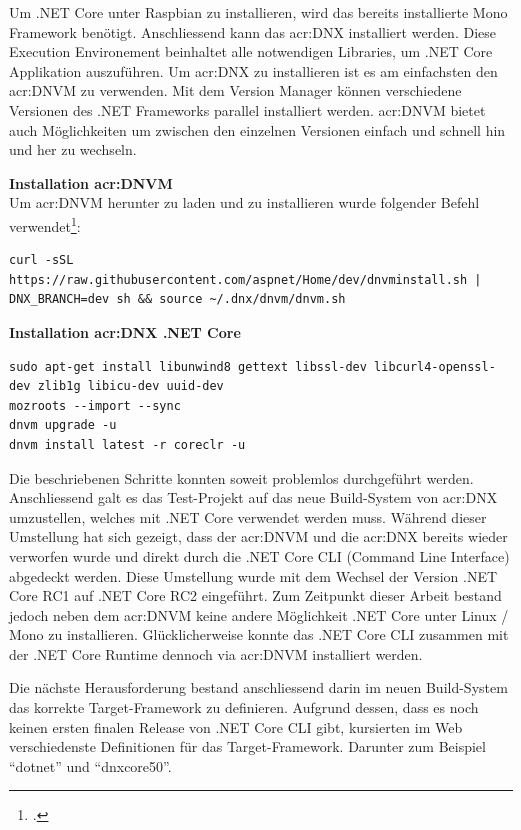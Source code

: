 Um .NET Core unter Raspbian zu installieren, wird das bereits installierte Mono Framework benötigt. Anschliessend kann das \gls{acr:DNX} installiert werden. Diese Execution Environement beinhaltet alle notwendigen Libraries, um .NET Core Applikation auszuführen. Um  \gls{acr:DNX} zu installieren ist es am einfachsten den \gls{acr:DNVM} zu verwenden. Mit dem Version Manager können verschiedene Versionen des .NET Frameworks parallel installiert werden. \gls{acr:DNVM} bietet auch Möglichkeiten um zwischen den einzelnen Versionen einfach und schnell hin und her zu wechseln.

\textbf{Installation \gls{acr:DNVM}} \\

Um \gls{acr:DNVM} herunter zu laden und zu installieren wurde folgender Befehl verwendet\footcite{Installing_ASPNET_5_2016-06-19}: 

\begin{lstlisting}
curl -sSL https://raw.githubusercontent.com/aspnet/Home/dev/dnvminstall.sh | DNX_BRANCH=dev sh && source ~/.dnx/dnvm/dnvm.sh
\end{lstlisting}


\textbf{Installation  \gls{acr:DNX} .NET Core} \\
\begin{lstlisting}
sudo apt-get install libunwind8 gettext libssl-dev libcurl4-openssl-dev zlib1g libicu-dev uuid-dev
mozroots --import --sync
dnvm upgrade -u
dnvm install latest -r coreclr -u
\end{lstlisting}

Die beschriebenen Schritte konnten soweit problemlos durchgeführt werden. Anschliessend galt es das Test-Projekt auf das neue Build-System von  \gls{acr:DNX} umzustellen, welches mit .NET Core verwendet werden muss. Während dieser Umstellung hat sich gezeigt, dass der \gls{acr:DNVM} und die  \gls{acr:DNX} bereits wieder verworfen wurde und direkt durch die .NET Core CLI (Command Line Interface) abgedeckt werden\footnotemark[1]. Diese Umstellung wurde mit dem Wechsel der Version .NET Core RC1 auf .NET Core RC2 eingeführt. Zum Zeitpunkt dieser Arbeit bestand jedoch neben dem \gls{acr:DNVM} keine andere Möglichkeit .NET Core unter Linux / Mono zu installieren. Glücklicherweise konnte das .NET Core CLI zusammen mit der .NET Core Runtime dennoch via \gls{acr:DNVM} installiert werden.


Die nächste Herausforderung bestand anschliessend darin im neuen Build-System das korrekte Target-Framework zu definieren. Aufgrund dessen, dass es noch keinen ersten finalen Release von .NET Core CLI gibt, kursierten im Web verschiedenste Definitionen für das Target-Framework. Darunter zum Beispiel "`dotnet"' und "`dnxcore50"'.

